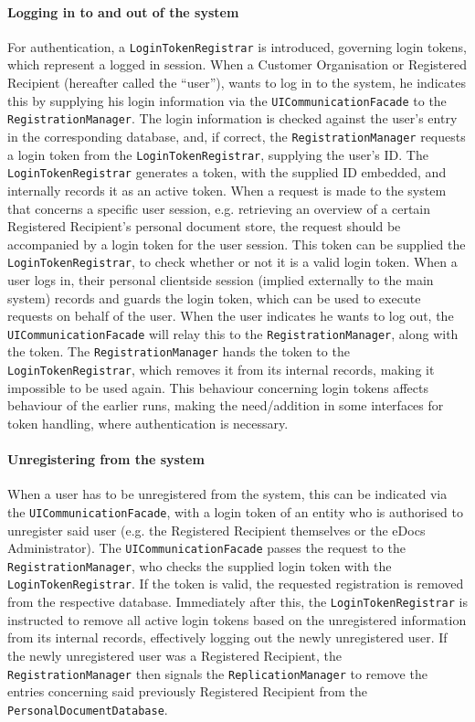 \documentclass[a4paper,10pt]{article}
\begin{document}
\paragraph{Logging in to and out of the system}
For authentication, a \texttt{LoginTokenRegistrar} is introduced, governing login tokens, which represent a logged in session. When a Customer Organisation or Registered Recipient (hereafter called the ``user''), wants to log in to the system, he indicates this by supplying his login information via the \texttt{UICommunicationFacade} to the \texttt{RegistrationManager}. The login information is checked against the user's entry in the corresponding database, and, if correct, the \texttt{RegistrationManager} requests a login token from the \texttt{LoginTokenRegistrar}, supplying the user's ID. The \texttt{LoginTokenRegistrar} generates a token, with the supplied ID embedded, and internally records it as an active token. When a request is made to the system that concerns a specific user session, e.g. retrieving an overview of a certain Registered Recipient's personal document store, the request should be accompanied by a login token for the user session. This token can be supplied the \texttt{LoginTokenRegistrar}, to check whether or not it is a valid login token. When a user logs in, their personal clientside session (implied externally to the main system) records and guards the login token, which can be used to execute requests on behalf of the user. When the user indicates he wants to log out, the \texttt{UICommunicationFacade} will relay this to the \texttt{RegistrationManager}, along with the token. The \texttt{RegistrationManager} hands the token to the \texttt{LoginTokenRegistrar}, which removes it from its internal records, making it impossible to be used again. This behaviour concerning login tokens affects behaviour of the earlier runs, making the need/addition in some interfaces for token handling, where authentication is necessary.

\paragraph{Unregistering from the system}
When a user has to be unregistered from the system, this can be indicated via the \texttt{UICommunicationFacade}, with a login token of an entity who is authorised to unregister said user (e.g. the Registered Recipient themselves or the eDocs Administrator). The \texttt{UICommunicationFacade} passes the request to the \texttt{RegistrationManager}, who checks the supplied login token with the \texttt{LoginTokenRegistrar}. If the token is valid, the requested registration is removed from the respective database. Immediately after this, the \texttt{LoginTokenRegistrar} is instructed to remove all active login tokens based on the unregistered information from its internal records, effectively logging out the newly unregistered user. If the newly unregistered user was a Registered Recipient, the \texttt{RegistrationManager} then signals the \texttt{ReplicationManager} to remove the entries concerning said previously Registered Recipient from the \texttt{PersonalDocumentDatabase}.
\end{document}
